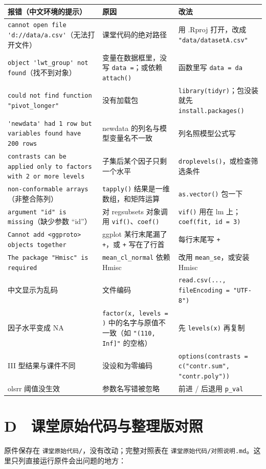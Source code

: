 \begin{tabular}{p{5.2cm}p{4.2cm}p{4.8cm}}
\toprule
报错（中文环境的提示） & 原因 & 改法\\
\midrule


\Verb|cannot open file 'd://data/a.csv'|（无法打开文件） & 课堂代码的绝对路径 & 用 .Rproj 打开，改成 \Verb|"data/datasetA.csv"|\\
\Verb|object 'lwt_group' not found|（找不到对象） & 变量在数据框里，没写 \Verb|data =|；或依赖 \Verb|attach()| & 函数里写 \Verb|data = da|\\
\Verb|could not find function "pivot_longer"| & 没有加载包 & \Verb|library(tidyr)|；包没装就先 \Verb|install.packages()|\\
\Verb|'newdata' had 1 row but variables found have 200 rows| & newdata 的列名与模型变量名不一致 & 列名照模型公式写\\
\Verb|contrasts can be applied only to factors with 2 or more levels| & 子集后某个因子只剩一个水平 & \Verb|droplevels()|，或检查筛选条件\\
\Verb|non-conformable arrays|（非整合陈列） & \Verb|tapply()| 结果是一维数组，和矩阵运算 & \Verb|as.vector()| 包一下\\
\Verb|argument "id" is missing|（缺少参数 “id”） & 对 regsubsets 对象调用 \Verb|vif()|、\Verb|coef()| & \Verb|vif()| 用在 lm 上；\Verb|coef(fit, id = 3)|\\
\Verb|Cannot add <ggproto> objects together| & ggplot 某行末尾漏了 \Verb|+|，或 \Verb|+| 写在了行首 & 每行末尾写 \Verb|+|\\
\Verb|The package "Hmisc" is required| & \Verb|mean_cl_normal| 依赖 Hmisc & 改用 \Verb|mean_se|，或安装 Hmisc\\
中文显示为乱码 & 文件编码 & \Verb|read.csv(..., fileEncoding = "UTF-8")|\\
因子水平变成 NA & \Verb|factor(x, levels = )| 中的名字与原值不一致（如 \Verb|"(110, Inf]"| 的空格） & 先 \Verb|levels(x)| 再复制\\
III 型结果与课件不同 & 没设和为零编码 & \Verb|options(contrasts = c("contr.sum", "contr.poly"))|\\
olsrr 阈值没生效 & 参数名写错被忽略 & 前进 / 后退用 \Verb|p_val|\\
\bottomrule
\end{tabular}



\section{D　课堂原始代码与整理版对照}
\label{app:orig}
原件保存在 \Verb|课堂原始代码/|，没有改动；完整对照表在 \Verb|课堂原始代码/对照说明.md|。这里只列直接运行原件会出问题的地方：

